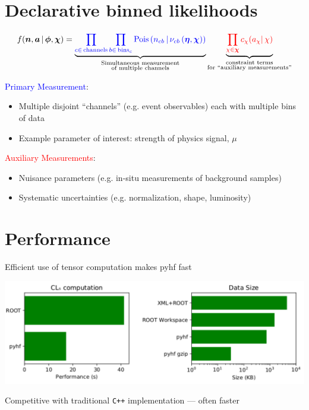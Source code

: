 \documentclass[princeton,portrait]{a0poster}
\begin{document}
\begin{multicols}{2}
 \section*{\LARGE\color{MediumBlue} Declarative binned likelihoods}

 \[
  f(\bm{n}, \bm{a} \,|\,\bm{\phi},\bm{\chi}) = \underbrace{\color{blue}{\prod_{c\in\mathrm{\,channels}} \prod_{b \in \mathrm{\,bins}_c}\textrm{Pois}\left(n_{cb} \,\middle|\, \nu_{cb}\left(\bm{\eta},\bm{\chi}\right)\right)}}_{\substack{\text{Simultaneous measurement}\\%
    \text{of multiple channels}}} \underbrace{\color{red}{\prod_{\chi \in \bm{\chi}} c_{\chi}(a_{\chi} |\, \chi)}}_{\substack{\text{constraint terms}\\%
    \text{for }\text{``auxiliary measurements''}}}
 \]

 \noindent\textcolor{blue}{Primary Measurement}:
 \begin{itemize}
  \item Multiple disjoint ``channels'' (e.g. event observables) each with multiple bins of data
  \item Example parameter of interest: strength of physics signal, $\mu$
 \end{itemize}
 \textcolor{red}{Auxiliary Measurements}:
 \begin{itemize}
  \item Nuisance parameters (e.g. in-situ measurements of background samples)
  \item Systematic uncertainties (e.g. normalization, shape, luminosity)
 \end{itemize}

 \section*{\LARGE\color{MediumBlue} Performance}
 Efficient use of tensor computation makes pyhf fast
 \begin{center}
  \includegraphics[width=0.9\linewidth]{performance_only.pdf}
 \end{center}
 Competitive with traditional \texttt{C++} implementation --- often faster


\end{multicols}
\end{document}
